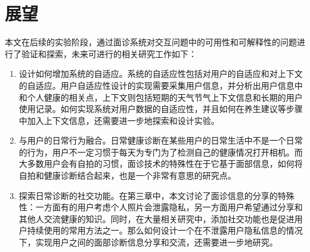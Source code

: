 \section{展望}
本文在后续的实验阶段，通过面诊系统对交互问题中的可用性和可解释性的问题进行了验证和探索，未来可进行的相关研究工作如下：
\begin{enumerate}
	\item 设计如何增加系统的自适应。系统的自适应性包括对用户的自适应和对上下文的自适应。用户自适应性设计的实现需要采集用户信息，并分析出用户信息中和个人健康的相关点，上下文则包括短期的天气节气上下文信息和长期的用户使用记录。如何实现系统对用户数据的自适应性，并且如何在养生建议等步骤中加入上下文信息，还需要进一步地探索和设计实验。

	\item 与用户的日常行为融合。日常健康诊断在某些用户的日常生活中不是一个日常的行为，用户不一定习惯于每天为专门为了检测自己的健康情况打开相机。而大多数用户会有自拍的习惯，面诊技术的特殊性在于它基于面部信息，如何将自拍和健康诊断结合起来，也是一个非常有意思的研究点。

	\item 探索日常诊断的社交功能。在第三章中，本文讨论了面诊信息的分享的特殊性：一方面有的用户考虑个人照片会泄露隐私，另一方面用户希望通过分享和其他人交流健康的知识。同时，在大量相关研究中，添加社交功能也是促进用户持续使用的常用方法之一。那么如何设计一个在不泄露用户隐私信息的情况下，实现用户之间的面部诊断信息分享和交流，还需要进一步地研究。
	
\end{enumerate}